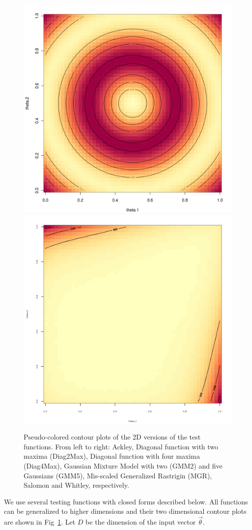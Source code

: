 \begin{figure}[htbp]
\begin{center}
\includegraphics[width=0.24\linewidth]{figs/chap5/Salomon.png}
\includegraphics[width=0.24\linewidth]{figs/chap5/Whitley.png}
\caption{Pseudo-colored contour plots of the 2D versions of the test functions.
%
From left to right: Ackley, Diagonal function with two maxima (Diag2Max), Diagonal function with four maxima (Diag4Max), Gaussian Mixture Model with two (GMM2) and five Gaussians (GMM5), Mis-scaled Generalized Rastrigin (MGR), Salomon and Whitley, respectively.}
\label{fig:original}
\end{center}
\end{figure}

We use several testing functions with closed forms described below.
%
All functions can be generalized to higher dimensions and their two dimensional contour plots are shown in Fig~\ref{fig:original}.
%
Let $D$ be the dimension of the input vector $\vec{\theta}$.



